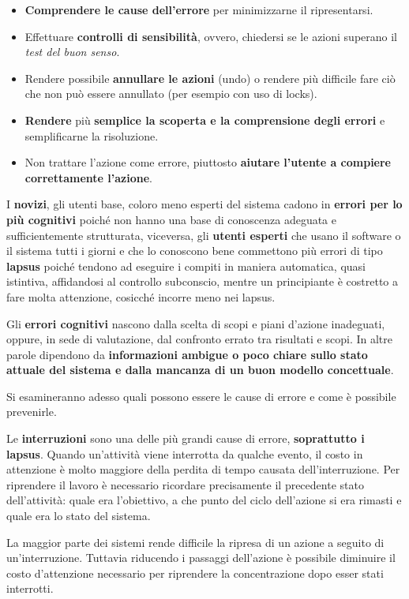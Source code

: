 \begin{itemize}
	\item \textbf{Comprendere le cause dell'errore} per minimizzarne il ripresentarsi.
	\item Effettuare \textbf{controlli di sensibilità}, ovvero, chiedersi se le azioni superano il \textit{test del buon senso}.
	\item Rendere possibile \textbf{annullare le azioni} (undo) o rendere più difficile fare ciò che non può essere annullato (per esempio con uso di locks).
	\item \textbf{Rendere} più \textbf{semplice la scoperta e la comprensione degli errori} e semplificarne la risoluzione.
	\item Non trattare l'azione come errore, piuttosto \textbf{aiutare l'utente a compiere correttamente l'azione}.
\end{itemize}

I \textbf{novizi}, gli utenti base, coloro meno esperti del sistema cadono in \textbf{errori per lo più cognitivi} poiché non hanno una base di conoscenza adeguata e sufficientemente strutturata, viceversa, gli \textbf{utenti esperti} che usano il software o il sistema tutti i giorni e che lo conoscono bene commettono più errori di tipo \textbf{lapsus} poiché tendono ad eseguire i compiti in maniera automatica, quasi istintiva, affidandosi al controllo subconscio, mentre un
principiante è costretto a fare molta attenzione, cosicché incorre meno nei lapsus.

Gli \textbf{errori cognitivi} nascono dalla scelta di scopi e piani d'azione inadeguati, oppure, in sede di valutazione, dal confronto errato tra risultati e scopi. In altre parole dipendono da \textbf{informazioni ambigue o poco chiare sullo stato attuale del sistema e dalla mancanza di un buon modello concettuale}.

Si esamineranno adesso quali possono essere le cause di errore e come è possibile prevenirle.

Le \textbf{interruzioni} sono una delle più grandi cause di errore, \textbf{soprattutto i lapsus}. Quando un'attività viene interrotta da qualche evento, il costo in attenzione è molto maggiore della perdita di tempo causata dell'interruzione. Per riprendere il lavoro è necessario ricordare precisamente il precedente stato dell'attività: quale era l'obiettivo, a che punto del ciclo dell'azione si era rimasti e quale era lo stato del sistema.

La maggior parte dei sistemi rende difficile la ripresa di un azione a seguito di un'interruzione. Tuttavia riducendo i passaggi dell'azione è possibile diminuire il costo d'attenzione necessario per riprendere la concentrazione dopo esser stati interrotti.

